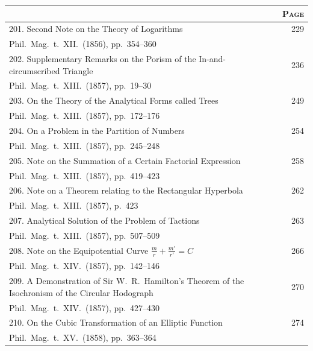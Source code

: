 \documentclass[12pt,a4paper]{article}
\theoremstyle{plain}
\begin{document}
\clearpage

\begin{longtable}{p{}r}
\toprule
\multicolumn{1}{c}{} & \multicolumn{1}{c}{\textsc{Page}} \\
\midrule
\endhead
201. Second Note on the Theory of Logarithms \dotfill & 229 \\
\multicolumn{2}{l}{\small Phil.\ Mag.\ t.~XII.\ (1856), pp.~354--360} \\[0.5em]
%
202. Supplementary Remarks on the Porism of the In-and-circumscribed Triangle \dotfill & 236 \\
\multicolumn{2}{l}{\small Phil.\ Mag.\ t.~XIII.\ (1857), pp.~19--30} \\[0.5em]
%
203. On the Theory of the Analytical Forms called Trees \dotfill & 249 \\
\multicolumn{2}{l}{\small Phil.\ Mag.\ t.~XIII.\ (1857), pp.~172--176} \\[0.5em]
%
204. On a Problem in the Partition of Numbers \dotfill & 254 \\
\multicolumn{2}{l}{\small Phil.\ Mag.\ t.~XIII.\ (1857), pp.~245--248} \\[0.5em]
%
205. Note on the Summation of a Certain Factorial Expression \dotfill & 258 \\
\multicolumn{2}{l}{\small Phil.\ Mag.\ t.~XIII.\ (1857), pp.~419--423} \\[0.5em]
%
206. Note on a Theorem relating to the Rectangular Hyperbola \dotfill & 262 \\
\multicolumn{2}{l}{\small Phil.\ Mag.\ t.~XIII.\ (1857), p.~423} \\[0.5em]
%
207. Analytical Solution of the Problem of Tactions \dotfill & 263 \\
\multicolumn{2}{l}{\small Phil.\ Mag.\ t.~XIII.\ (1857), pp.~507--509} \\[0.5em]
%
208. Note on the Equipotential Curve $\frac{m}{r}+\frac{m'}{r'}=C$ \dotfill & 266 \\
\multicolumn{2}{l}{\small Phil.\ Mag.\ t.~XIV.\ (1857), pp.~142--146} \\[0.5em]
%
209. A Demonstration of Sir W.~R.\ Hamilton's Theorem of the Isochronism of the Circular Hodograph \dotfill & 270 \\
\multicolumn{2}{l}{\small Phil.\ Mag.\ t.~XIV.\ (1857), pp.~427--430} \\[0.5em]
%
210. On the Cubic Transformation of an Elliptic Function \dotfill & 274 \\
\multicolumn{2}{l}{\small Phil.\ Mag.\ t.~XV.\ (1858), pp.~363--364} \\[0.5em]

\end{longtable}
\end{document}
